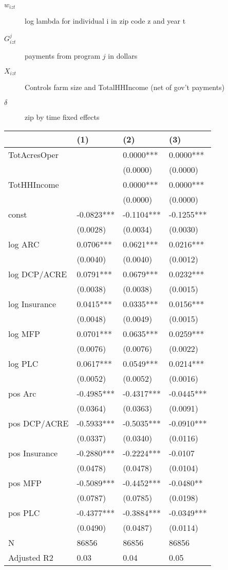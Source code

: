 \documentclass[11pt]{article}
\begin{document}
\begin{description}
\item[{\(w_{izt}\)}] log lambda for individual i in zip code z and year t
\item[{\(G_{izt}^{j}\)}] payments from program \(j\) in dollars
\item[{\(X_{izt}\)}] Controls farm size and TotalHHIncome (net of gov't payments)
\item[{\(\delta\)}] zip by time fixed effects
\end{description}

\begin{center}
\begin{tabular}{llll}
\hline
 & (1) & (2) & (3)\\[0pt]
\hline
TotAcresOper &  & 0.0000*** & 0.0000***\\[0pt]
 &  & (0.0000) & (0.0000)\\[0pt]
TotHHIncome &  & 0.0000*** & 0.0000***\\[0pt]
 &  & (0.0000) & (0.0000)\\[0pt]
const & -0.0823*** & -0.1104*** & -0.1255***\\[0pt]
 & (0.0028) & (0.0034) & (0.0030)\\[0pt]
log ARC & 0.0706*** & 0.0621*** & 0.0216***\\[0pt]
 & (0.0040) & (0.0040) & (0.0012)\\[0pt]
log DCP/ACRE & 0.0791*** & 0.0679*** & 0.0232***\\[0pt]
 & (0.0038) & (0.0038) & (0.0015)\\[0pt]
log Insurance & 0.0415*** & 0.0335*** & 0.0156***\\[0pt]
 & (0.0048) & (0.0049) & (0.0015)\\[0pt]
log MFP & 0.0701*** & 0.0635*** & 0.0259***\\[0pt]
 & (0.0076) & (0.0076) & (0.0022)\\[0pt]
log PLC & 0.0617*** & 0.0549*** & 0.0214***\\[0pt]
 & (0.0052) & (0.0052) & (0.0016)\\[0pt]
pos Arc & -0.4985*** & -0.4317*** & -0.0445***\\[0pt]
 & (0.0364) & (0.0363) & (0.0091)\\[0pt]
pos DCP/ACRE & -0.5933*** & -0.5035*** & -0.0910***\\[0pt]
 & (0.0337) & (0.0340) & (0.0116)\\[0pt]
pos Insurance & -0.2880*** & -0.2224*** & -0.0107\\[0pt]
 & (0.0478) & (0.0478) & (0.0104)\\[0pt]
pos MFP & -0.5089*** & -0.4452*** & -0.0480**\\[0pt]
 & (0.0787) & (0.0785) & (0.0198)\\[0pt]
pos PLC & -0.4377*** & -0.3884*** & -0.0349***\\[0pt]
 & (0.0490) & (0.0487) & (0.0114)\\[0pt]
N & 86856 & 86856 & 86856\\[0pt]
Adjusted R2 & 0.03 & 0.04 & 0.05\\[0pt]
\end{tabular}
\end{center}
\end{document}
